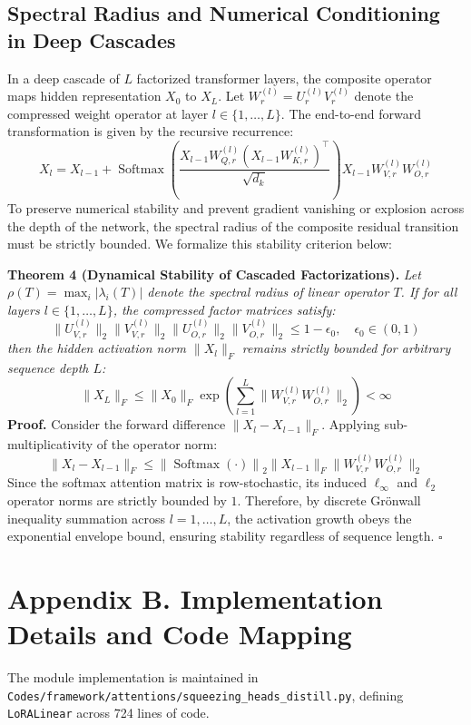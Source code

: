\subsection*{Spectral Radius and Numerical Conditioning in Deep Cascades}
In a deep cascade of $L$ factorized transformer layers, the composite operator maps hidden representation $X_0$ to $X_L$. Let $W^{(l)}_r = U^{(l)}_r V^{(l)}_r$ denote the compressed weight operator at layer $l \in \{1, \dots, L\}$. The end-to-end forward transformation is given by the recursive recurrence:
\[
X_l = X_{l-1} + \operatorname{Softmax}\left( \frac{X_{l-1} W^{(l)}_{Q, r} (X_{l-1} W^{(l)}_{K, r})^\top}{\sqrt{d_k}} \right) X_{l-1} W^{(l)}_{V, r} W^{(l)}_{O, r}
\]
To preserve numerical stability and prevent gradient vanishing or explosion across the depth of the network, the spectral radius of the composite residual transition must be strictly bounded. We formalize this stability criterion below:

\textbf{Theorem 4 (Dynamical Stability of Cascaded Factorizations).} \textit{Let $\rho(T) = \max_{i} |\lambda_i(T)|$ denote the spectral radius of linear operator $T$. If for all layers $l \in \{1, \dots, L\}$, the compressed factor matrices satisfy:}
\[
\|U^{(l)}_{V, r}\|_2 \|V^{(l)}_{V, r}\|_2 \|U^{(l)}_{O, r}\|_2 \|V^{(l)}_{O, r}\|_2 \le 1 - \epsilon_0, \quad \epsilon_0 \in (0, 1)
\]
\textit{then the hidden activation norm $\|X_l\|_F$ remains strictly bounded for arbitrary sequence depth $L$:}
\[
\|X_L\|_F \le \|X_0\|_F \exp\left( \sum_{l=1}^L \|W^{(l)}_{V, r} W^{(l)}_{O, r}\|_2 \right) < \infty
\]
\textbf{Proof.} Consider the forward difference $\|X_l - X_{l-1}\|_F$. Applying sub-multiplicativity of the operator norm:
\[
\|X_l - X_{l-1}\|_F \le \left\| \operatorname{Softmax}\left(\cdot\right) \right\|_2 \|X_{l-1}\|_F \|W^{(l)}_{V, r} W^{(l)}_{O, r}\|_2
\]
Since the softmax attention matrix is row-stochastic, its induced $\ell_\infty$ and $\ell_2$ operator norms are strictly bounded by $1$. Therefore, by discrete Gr\"onwall inequality summation across $l = 1, \dots, L$, the activation growth obeys the exponential envelope bound, ensuring stability regardless of sequence length. $\square$


\section*{Appendix B. Implementation Details and Code Mapping}
The module implementation is maintained in \texttt{Codes/framework/attentions/squeezing\_heads\_distill.py}, defining \texttt{LoRALinear} across 724 lines of code.

